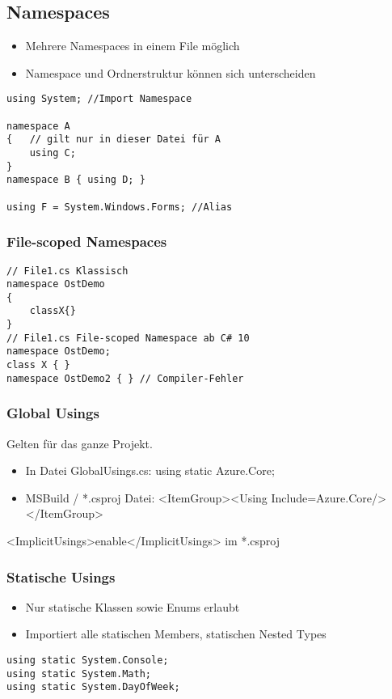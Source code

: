 \begin{multicols*}{2}
\subsection{Namespaces}
\begin{itemize}
    \item Mehrere Namespaces in einem File möglich
    \item Namespace und Ordnerstruktur können sich unterscheiden
\end{itemize}
\begin{lstlisting}
using System; //Import Namespace

namespace A
{   // gilt nur in dieser Datei für A
    using C; 
}
namespace B { using D; }

using F = System.Windows.Forms; //Alias
\end{lstlisting}
\subsubsection{File-scoped Namespaces}
\begin{lstlisting}
// File1.cs Klassisch
namespace OstDemo
{
    classX{}
}
// File1.cs File-scoped Namespace ab C# 10
namespace OstDemo;
class X { }
namespace OstDemo2 { } // Compiler-Fehler
\end{lstlisting}
\subsubsection{Global Usings}
Gelten für das ganze Projekt.
\begin{itemize}
    \item In Datei GlobalUsings.cs: using static Azure.Core;
    \item MSBuild / *.csproj Datei: <ItemGroup><Using Include=\dq Azure.Core\dq /></ItemGroup>
\end{itemize}
 <ImplicitUsings>enable</ImplicitUsings> im *.csproj
\subsubsection{Statische Usings}
\begin{itemize}
    \item Nur statische Klassen sowie Enums erlaubt
    \item Importiert alle statischen Members, statischen Nested Types
\end{itemize}
\begin{lstlisting}
using static System.Console; 
using static System.Math; 
using static System.DayOfWeek;


\end{lstlisting}
\end{multicols*}
